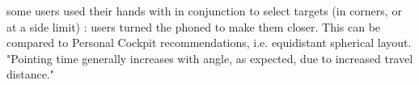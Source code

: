some users used their hands with  in conjunction to select targets (in corners, or at a side limit) : users turned the phoned to make them closer. This can be compared to Personal Cockpit recommendations, i.e. equidistant spherical layout.
"Pointing time generally increases with angle, as expected, due to increased travel distance." \cite[p. 7]{Ens2014}




